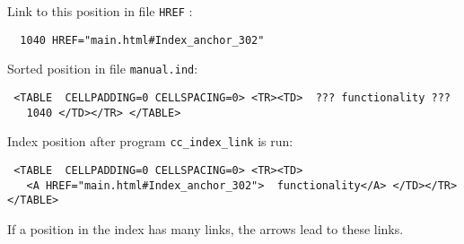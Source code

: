 Link to this position in file \verb|HREF| :
  \begin{verbatim}
  1040 HREF="main.html#Index_anchor_302"
  \end{verbatim}

Sorted position in file \verb|manual.ind|:
 \begin{verbatim}
 <TABLE  CELLPADDING=0 CELLSPACING=0> <TR><TD>  ??? functionality ??? 
   1040 </TD></TR> </TABLE>
 \end{verbatim}

Index position after program \verb|cc_index_link| is run:
 \begin{verbatim}
 <TABLE  CELLPADDING=0 CELLSPACING=0> <TR><TD> 
   <A HREF="main.html#Index_anchor_302">  functionality</A> </TD></TR> </TABLE>
 \end{verbatim}


If a position in the index has many links, the arrows lead to these links.



